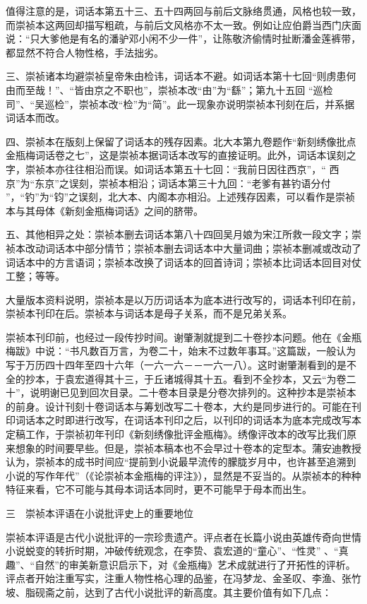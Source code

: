 \documentclass[a4paper,12pt,UTF8,twoside]{ctexbook}
\begin{document}
值得注意的是，词话本第五十三、五十四两回与前后文脉络贯通，风格也较一致，而崇祯本这两回却描写粗疏，与前后文风格亦不太一致。例如让应伯爵当西门庆面说：“只大爹他是有名的潘驴邓小闲不少一件”，让陈敬济偷情时扯断潘金莲裤带，都显然不符合人物性格，手法拙劣。

三、崇祯诸本均避崇祯皇帝朱由检讳，词话本不避。如词话本第十七回“则虏患何由而至哉！”、“皆由京之不职也”，崇祯本改“由”为“繇”；第九十五回 “巡检司”、“吴巡检”，崇祯本改“检”为“简”。此一现象亦说明崇祯本刊刻在后，并系据词话本而改。

四、崇祯本在版刻上保留了词话本的残存因素。北大本第九卷题作“新刻绣像批点金瓶梅词话卷之七”，这是崇祯本据词话本改写的直接证明。此外，词话本误刻之字，崇祯本亦往往相沿而误。如词话本第五十七回：“我前日因往西京”，“ 西京”为“东京”之误刻，崇祯本相沿；词话本第三十九回：“老爹有甚钓语分付 ”，“钓”为“钧”之误刻，北大本、内阁本亦相沿。上述残存因素，可以看作是崇祯本与其母体《新刻金瓶梅词话》之间的脐带。

五、其他相异之处：崇祯本删去词话本第八十四回吴月娘为宋江所救一段文字；崇祯本改动词话本中部分情节；崇祯本删去词话本中大量词曲；崇祯本删减或改动了词话本中的方言语词；崇祯本改换了词话本的回首诗词；崇祯本比词话本回目对仗工整；等等。

大量版本资料说明，崇祯本是以万历词话本为底本进行改写的，词话本刊印在前，崇祯本刊印在后。崇祯本与词话本是母子关系，而不是兄弟关系。

崇祯本刊印前，也经过一段传抄时间。谢肇淛就提到二十卷抄本问题。他在《金瓶梅跋》中说：“书凡数百万言，为卷二十，始末不过数年事耳。”这篇跋，一般认为写于万历四十四年至四十六年（一六一六－－一六一八）。这时谢肇淛看到的是不全的抄本，于袁宏道得其十三，于丘诸城得其十五。看到不全抄本，又云“为卷二十”，说明谢已见到回次目录。二十卷本目录是分卷次排列的。这种抄本是崇祯本的前身。设计刊刻十卷词话本与筹划改写二十卷本，大约是同步进行的。可能在刊印词话本之时即进行改写，在词话本刊印之后，以刊印的词话本为底本完成改写本定稿工作，于崇祯初年刊印《新刻绣像批评金瓶梅》。绣像评改本的改写比我们原来想象的时间要早些。但是，崇祯本稿本也不会早过十卷本的定型本。蒲安迪教授认为，崇祯本的成书时间应“提前到小说最早流传的朦胧岁月中，也许甚至追溯到小说的写作年代”（《论崇祯本金瓶梅的评注》），显然是不妥当的。从崇祯本的种种特征来看，它不可能与其母本词话本同时，更不可能早于母本而出生。

三　崇祯本评语在小说批评史上的重要地位

崇祯本评语是古代小说批评的一宗珍贵遗产。评点者在长篇小说由英雄传奇向世情小说蜕变的转折时期，冲破传统观念，在李贽、袁宏道的“童心”、“性灵” 、“真趣”、“自然”的审美新意识启示下，对《金瓶梅》艺术成就进行了开拓性的评析。评点者开始注重写实，注重人物性格心理的品鉴，在冯梦龙、金圣叹、李渔、张竹坡、脂砚斋之前，达到了古代小说批评的新高度。其主要价值有如下几点：
\end{document}
